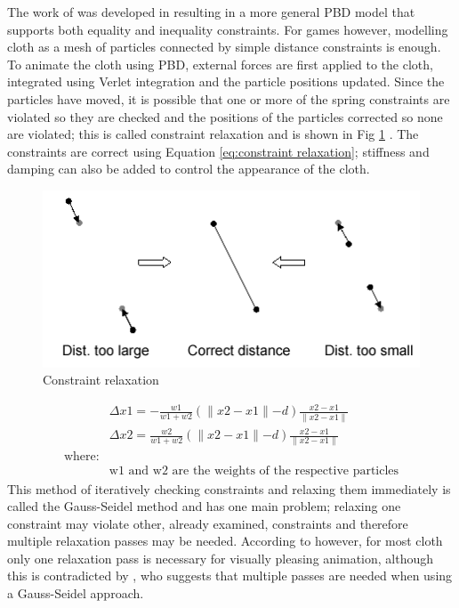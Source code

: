 The work of \textcite{Jakobsen2005} was developed in \textcite{Muller2006} resulting in a more general PBD model that supports both equality and inequality constraints. For games however, modelling cloth as a mesh of particles connected by simple distance constraints is enough.
\\To animate the cloth using PBD, external forces are first applied to the cloth, integrated using Verlet integration and the particle positions updated. Since the particles have moved, it is possible that one or more of the spring constraints are violated so they are checked and the positions of the particles corrected so none are violated; this is called constraint relaxation and is shown in Fig \ref{fig:constraint relaxation} . The constraints are correct using Equation \ref{eq:constraint relaxation}\parencite[4]{Muller2006}; stiffness and damping can also be added to control the appearance of the cloth.
\begin{figure}[tp]
   \begin{center}
     \includegraphics{Figures/pbd}
   \end{center}
   \caption[Constraint relaxation]{Constraint relaxation \parencite[1]{Jakobsen2005}}
   \label{fig:constraint relaxation}
\end{figure}
\begin{equation}
\begin{split}
\label{eq:constraint relaxation}
  &\Delta x1 = - \frac{w1}{w1 + w2}(\parallel x2 - x1 \parallel - d)\frac{x2 - x1}{\parallel x2 - x1 \parallel}
  \\&\Delta x2 = \frac{w2}{w1 + w2}(\parallel x2 - x1 \parallel - d)\frac{x2 - x1}{\parallel x2 - x1 \parallel}
  \\\text{where:}
  \\&\text{w1 and w2 are the weights of the respective particles}
\end{split}
\end{equation}
This method of iteratively checking constraints and relaxing them immediately is called the Gauss-Seidel method and has one main problem; relaxing one constraint may violate other, already examined, constraints and therefore multiple relaxation passes may be needed. According to \textcite[1]{Jakobsen2005} however, for most cloth only one relaxation pass is necessary for visually pleasing animation, although this is contradicted by \parencite{Kim2011}, who suggests that multiple passes are needed when using a Gauss-Seidel approach.
